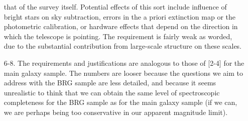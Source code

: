 \begin{enumerate}
that of the survey itself.  Potential effects of this sort include
influence of bright stars on sky subtraction, errors in the a priori
extinction map or the photometric calibration, or hardware effects
that depend on the direction in which the telescope is pointing.
The requirement is fairly weak as worded, due to the substantial
contribution from large-scale structure on these scales. 
\item[6-8.] The requirements and justifications are analogous to those
of [2-4] for the main galaxy sample.  The numbers are looser because
the questions we aim to address with the BRG sample are less detailed,
and because it seems unrealistic to think that we can obtain the same
level of spectroscopic completeness for the BRG sample as for the
main galaxy sample (if we can, we are perhaps being too conservative
in our apparent magnitude limit).   


\end{enumerate}
